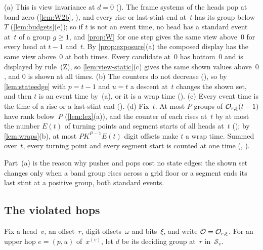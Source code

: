 \begin{outline}
(a) This is view invariance at $d=0$ (). The frame systems of the heads pop at band zero
(\cref{lem:W2b}, ), and every rise or last-stint end at~$t$ has its group below~$T$
(\cref{lem:budgets}(e)); so if $t$ is not an event time, no head has a standard event at~$t$ of a group $g\ge1$, and
\cref{prop:W} for one step gives the same view above~$0$ for every head at $t-1$ and~$t$. By \cref{prop:exposure}(a) the composed
display has the same view above~$0$ at both times. Every candidate at~$0$ has bottom~$0$ and is displayed by rule~(Z), so
\cref{lem:view-static}(c) gives the same shown values above~$0$, and $0$ is shown at all times. (b) The counters do not decrease
(), so by \cref{lem:stateedge} with $p=t-1$ and $u=t$ a descent at~$t$ changes the shown set, and then $t$
is an event time by~(a), or it is a wrap time (). (c) Every event time is the time of a rise or a last-stint
end (). (d) Fix~$t$. At most $P$ groups of $\mathcal{O}_{r,\xi}(t-1)$ have rank below~$P$ (\cref{lem:lex}(a)), and
the counter of each rises at~$t$ by at most the number $E(t)$ of turning points and segment starts of all heads at~$t$
(); by \cref{lem:wraps}(b), at most $PK^{P-1}E(t)$ digit offsets make $t$ a wrap time. Summed over~$t$,
every turning point and every segment start is counted at one time (, ).
\end{outline}

Part~(a) is the reason why pushes and pops cost no state edges: the shown set changes only when a band group rises across a grid
floor or a segment ends its last stint at a positive group, both standard events.

\subsection{The violated hops}\label{sec:acc-hops}

Fix a head~$v$, an offset~$r$, digit offsets~$\omega$ and bits~$\xi$, and write $\mathcal{O}=\mathcal{O}_{r,\xi}$. For an upper hop $e=(p,u)$
of~$x^{(v)}$, let $d$ be its deciding group at~$r$ in~$\mathcal S_v$.

